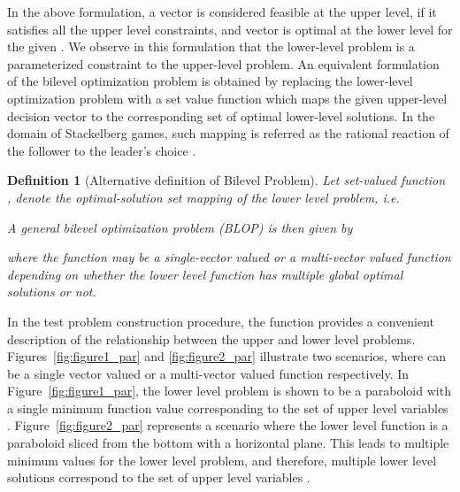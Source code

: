 \documentclass[twoside]{article}
\newtheorem{definition}[theorem]{Definition}
\begin{document}
In the above formulation, a vector  is considered feasible at the upper level, if it satisfies all the upper level constraints, and vector  is optimal at the lower level for the given .
We observe in this formulation that the lower-level problem is a parameterized constraint to the upper-level problem. An equivalent formulation of the bilevel optimization problem is obtained by replacing the lower-level optimization problem with a set value function which maps the given upper-level decision vector to the corresponding set of optimal lower-level solutions. In the domain of Stackelberg games, such mapping is referred as the rational reaction of the follower to the leader's choice .

\vskip 0.2cm
\begin{definition}[Alternative definition of Bilevel Problem] Let set-valued function , denote the optimal-solution set mapping of the lower level problem, i.e.
 
A general bilevel optimization problem (BLOP) is then given by

where the function  may be a single-vector valued or a multi-vector valued function depending on whether the lower level function has multiple global optimal solutions or not.
\end{definition}
\vskip 0.2cm

In the test problem construction procedure, the  function provides a convenient description of the relationship between the upper and lower level problems. Figures~\ref{fig:figure1_par} and \ref{fig:figure2_par} illustrate two scenarios, where  can be a single vector valued or a multi-vector valued function respectively. In Figure~\ref{fig:figure1_par}, the lower level problem is shown to be a paraboloid with a single minimum function value corresponding to the set of upper level variables . Figure~\ref{fig:figure2_par} represents a scenario where the lower level function is a paraboloid sliced from the bottom with a horizontal plane. This leads to multiple minimum values for the lower level problem, and therefore, multiple lower level solutions correspond to the set of upper level variables .

\begin{figure*}
\begin{minipage}[t]{0.49\linewidth}
\begin{center}
\end{center}
\caption{Relationship between upper and lower level variables in case of a single-vector valued mapping. For simplicity the lower level function has the shape of a paraboloid.}
\label{fig:figure1_par}
\end{minipage}\hfill
\begin{minipage}[t]{0.49\linewidth}
\begin{center}
\end{center}
\caption{Relationship between upper and lower level variables in case of a multi-vector valued mapping. The lower level function is shown in the shape of a paraboloid with the bottom sliced with a plane.}
\label{fig:figure2_par}
\end{minipage}
\end{figure*}
\end{document}

